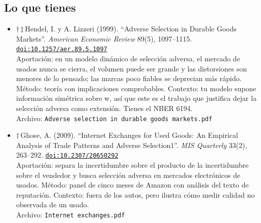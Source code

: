 \documentclass[11pt]{article}
\begin{document}
\subsection*{Lo que tienes}
\begin{itemize}
\item $\dagger$\,$\ddagger$\,Hendel, I. y A. Lizzeri (1999). ``Adverse Selection in Durable Goods Markets''. \textit{American Economic Review} 89(5), 1097--1115. \href{https://doi.org/10.1257/aer.89.5.1097}{\texttt{doi:10.1257/aer.89.5.1097}}\\
Aportación: en un modelo dinámico de selección adversa, el mercado de usados nunca se cierra, el volumen puede ser grande y las distorsiones son menores de lo pensado; las marcas poco fiables se deprecian más rápido. Método: teoría con implicaciones comprobables. Contexto: tu modelo supone información simétrica sobre w, así que este es el trabajo que justifica dejar la selección adversa como extensión. Tienes el NBER 6194.\\
{\footnotesize Archivo: \texttt{Adverse selection in durable goods markets.pdf}}
\item $\dagger$\,Ghose, A. (2009). ``Internet Exchanges for Used Goods: An Empirical Analysis of Trade Patterns and Adverse Selection1''. \textit{MIS Quarterly} 33(2), 263--292. \href{https://doi.org/10.2307/20650292}{\texttt{doi:10.2307/20650292}}\\
Aportación: separa la incertidumbre sobre el producto de la incertidumbre sobre el vendedor y busca selección adversa en mercados electrónicos de usados. Método: panel de cinco meses de Amazon con análisis del texto de reputación. Contexto: fuera de los autos, pero ilustra cómo medir calidad no observada de un usado.\\
{\footnotesize Archivo: \texttt{Internet exchanges.pdf}}
\end{itemize}
\end{document}
